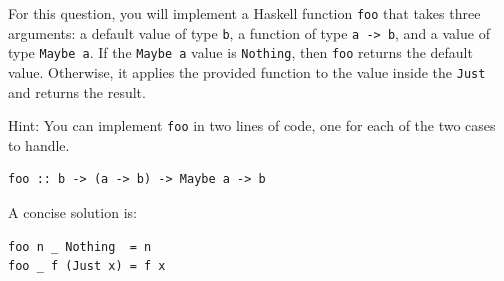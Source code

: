 \documentclass[addpoints]{exam}
\begin{document}
\begin{questions}

\newpage

\question[8] For this question, you will implement a Haskell function \verb|foo| that takes three arguments: a default value of type \verb|b|, a function of type \verb|a -> b|, and a value of type \verb|Maybe a|. If the \verb|Maybe a| value is \verb|Nothing|, then \verb|foo| returns the default value. Otherwise, it applies the provided function to the value inside the \verb|Just| and returns the result.

Hint: You can implement \verb|foo| in two lines of code, one for each of the two cases to handle.

\begin{verbatim}
foo :: b -> (a -> b) -> Maybe a -> b
\end{verbatim}
  \begin{solutionorbox}[2in]
A concise solution is:  
\begin{verbatim}
foo n _ Nothing  = n
foo _ f (Just x) = f x
\end{verbatim}


\end{solutionorbox}
\end{questions}
\end{document}
